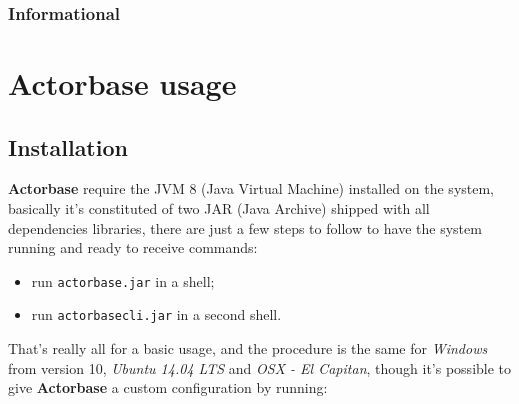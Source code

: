 \documentclass{scalatekids-article}
\begin{document}
\subsubsection{Informational} %








\section{Actorbase usage}

\subsection{Installation}

\textbf{Actorbase} require the JVM 8 (Java Virtual Machine) installed on the
system, basically it's constituted of two JAR (Java Archive) shipped with all
dependencies libraries, there are just a few steps to follow to have the system
running and ready to receive commands:
\begin{itemize}
\item run \verb=actorbase.jar= in a shell;
\item run \verb=actorbasecli.jar= in a second shell.
\end{itemize}
That's really all for a basic usage, and the procedure is the same for
\textit{Windows} from version 10, \textit{Ubuntu 14.04 LTS} and \textit{OSX - El
  Capitan}, though it's possible to give \textbf{Actorbase} a custom configuration by
running:

\end{document}
